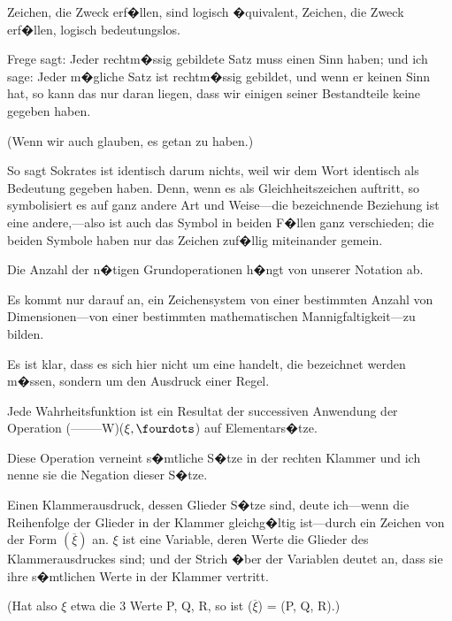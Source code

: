 \begin{propositions}
{Zeichen, die  Zweck erf�llen, sind logisch
�quivalent, Zeichen, die  Zweck erf�llen,
logisch bedeutungslos.}


{Frege sagt: Jeder rechtm�ssig gebildete Satz
muss einen Sinn haben; und ich sage: Jeder
m�gliche Satz ist rechtm�ssig gebildet, und wenn er
keinen Sinn hat, so kann das nur daran liegen, dass
wir einigen seiner Bestandteile keine 
gegeben haben.

(Wenn wir auch glauben, es getan zu haben.)

So sagt \glqq{}Sokrates ist identisch\grqq{} darum nichts,
weil wir dem Wort \glqq{}identisch\grqq{} als 
 Bedeutung gegeben haben. Denn,
wenn es als Gleichheitszeichen auftritt, so symbolisiert
es auf ganz andere Art und Weise---die
bezeichnende Beziehung ist eine an\-de\-re,---also ist
auch das Symbol in beiden F�llen ganz verschieden;
die beiden Symbole haben nur das Zeichen zuf�llig
miteinander gemein.}


{Die Anzahl der n�tigen Grundoperationen h�ngt
 von unserer Notation ab.}


{Es kommt nur darauf an, ein Zeichensystem von
einer bestimmten Anzahl von Dimensionen---von
einer bestimmten mathematischen Man\-nig\-fal\-tig\-keit---zu
bilden.}


{Es ist klar, dass es sich hier nicht um eine
 handelt, die
bezeichnet werden m�ssen, sondern um den
Ausdruck einer Regel.}


{Jede Wahrheitsfunktion ist ein Resultat der
successiven Anwendung der Operation \mbox{(--\;--\;--\;--\;--W)}\AllowBreak($\xi, \fourdots$)
auf Elementars�tze.

Diese Operation verneint s�mtliche S�tze in der
rechten Klammer und ich nenne sie die Negation
dieser S�tze.}


{Einen Klammerausdruck, dessen Glieder S�tze
sind, deute ich\AllowBreak---wenn die Reihenfolge der Glieder in
der Klammer gleichg�ltig ist---durch ein Zeichen von
der Form \glqq{}$(\overline{\xi})$\grqq{} an. \glqq{}$\xi$\grqq{} ist eine Variable, deren Werte
die Glieder des Klammerausdruckes sind; und der
Strich �ber der Variablen deutet an, dass sie ihre
s�mtlichen Werte in der Klammer vertritt.

(Hat also $\xi$ etwa die 3 Werte P, Q, R, so ist
($\overline{\xi}$) = (P, Q, R).)

}
\end{propositions}
